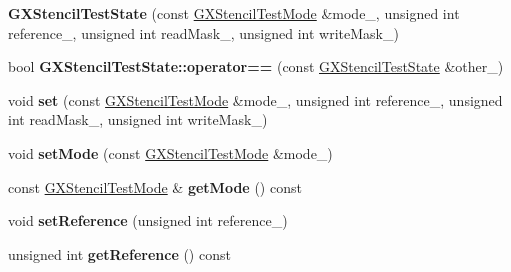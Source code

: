 \begin{DoxyCompactItemize}
\item 
{\bfseries G\+X\+Stencil\+Test\+State} (const \hyperlink{class_magnum_1_1_g_x_stencil_test_mode}{G\+X\+Stencil\+Test\+Mode} \&mode\+\_\+, unsigned int reference\+\_\+, unsigned int read\+Mask\+\_\+, unsigned int write\+Mask\+\_\+)\hypertarget{class_magnum_1_1_g_x_stencil_test_state_ab1e776945172ab2d8b117d58836ec69e}{}\label{class_magnum_1_1_g_x_stencil_test_state_ab1e776945172ab2d8b117d58836ec69e}

\item 
bool {\bfseries G\+X\+Stencil\+Test\+State\+::operator==} (const \hyperlink{class_magnum_1_1_g_x_stencil_test_state}{G\+X\+Stencil\+Test\+State} \&other\+\_\+)\hypertarget{class_magnum_1_1_g_x_stencil_test_state_ab76cddcc402f0703515d84d0d56ae062}{}\label{class_magnum_1_1_g_x_stencil_test_state_ab76cddcc402f0703515d84d0d56ae062}

\item 
void {\bfseries set} (const \hyperlink{class_magnum_1_1_g_x_stencil_test_mode}{G\+X\+Stencil\+Test\+Mode} \&mode\+\_\+, unsigned int reference\+\_\+, unsigned int read\+Mask\+\_\+, unsigned int write\+Mask\+\_\+)\hypertarget{class_magnum_1_1_g_x_stencil_test_state_ad3bc4c5948ce9b91ce756711a54ca682}{}\label{class_magnum_1_1_g_x_stencil_test_state_ad3bc4c5948ce9b91ce756711a54ca682}

\item 
void {\bfseries set\+Mode} (const \hyperlink{class_magnum_1_1_g_x_stencil_test_mode}{G\+X\+Stencil\+Test\+Mode} \&mode\+\_\+)\hypertarget{class_magnum_1_1_g_x_stencil_test_state_a252a8c287cf95e65a8d65c68ff1964b7}{}\label{class_magnum_1_1_g_x_stencil_test_state_a252a8c287cf95e65a8d65c68ff1964b7}

\item 
const \hyperlink{class_magnum_1_1_g_x_stencil_test_mode}{G\+X\+Stencil\+Test\+Mode} \& {\bfseries get\+Mode} () const \hypertarget{class_magnum_1_1_g_x_stencil_test_state_abca821fa034e80581044b2b2a6306ab4}{}\label{class_magnum_1_1_g_x_stencil_test_state_abca821fa034e80581044b2b2a6306ab4}

\item 
void {\bfseries set\+Reference} (unsigned int reference\+\_\+)\hypertarget{class_magnum_1_1_g_x_stencil_test_state_a82f36037d1ad92325686176b894e8974}{}\label{class_magnum_1_1_g_x_stencil_test_state_a82f36037d1ad92325686176b894e8974}

\item 
unsigned int {\bfseries get\+Reference} () const \hypertarget{class_magnum_1_1_g_x_stencil_test_state_aebb188eb78c560c8f07ce5fde341796f}{}\label{class_magnum_1_1_g_x_stencil_test_state_aebb188eb78c560c8f07ce5fde341796f}


\end{DoxyCompactItemize}

